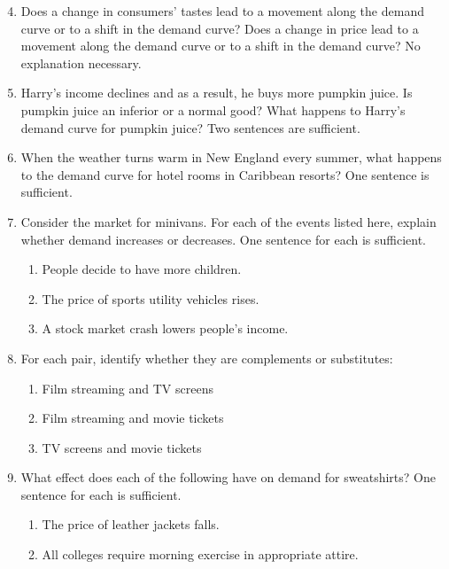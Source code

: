 \documentclass{article}
\begin{document}
\begin{enumerate}
\setcounter{enumi}{3}

\item Does a change in consumers' tastes lead to a movement along the demand curve or to a shift in the demand curve? Does a change in price lead to a movement along the demand curve or to a shift in the demand curve? No explanation necessary. 

\item Harry's income declines and as a result, he buys more pumpkin juice. Is pumpkin juice an inferior or a normal good? What happens to Harry's demand curve for pumpkin juice? Two sentences are sufficient.

\item When the weather turns warm in New England every summer, what happens to the demand curve for hotel rooms in Caribbean resorts? One sentence is sufficient.

\item Consider the market for minivans. For each of the events listed here, explain whether demand increases or decreases. One sentence for each is sufficient.

	\begin{enumerate}
	
	\item People decide to have more children.
	
	\item The price of sports utility vehicles rises.
	
	\item A stock market crash lowers people's income.
	
	\end{enumerate}
	
\item For each pair, identify whether they are complements or substitutes:

	\begin{enumerate}
	
	\item Film streaming and TV screens
	
	\item Film streaming and movie tickets
	
	\item TV screens and movie tickets
	
	\end{enumerate}
	
\item What effect does each of the following have on demand for sweatshirts? One sentence for each is sufficient. 

	\begin{enumerate}
	
	\item The price of leather jackets falls.
	
	\item All colleges require morning exercise in appropriate attire.
	
	\end{enumerate}

\end{enumerate}
\end{document}
